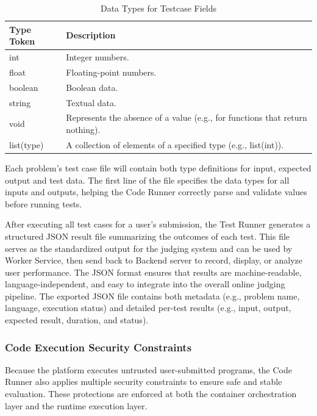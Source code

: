 \begin{table}[h!]
\centering
\renewcommand{\arraystretch}{1.3}
\begin{tabular}{|p{4cm}|p{10cm}|}
\hline
\textbf{Type Token} & \textbf{Description} \\ \hline

int & Integer numbers. \\ \hline

float & Floating-point numbers. \\ \hline

boolean & Boolean data. \\ \hline

string & Textual data. \\ \hline

void & Represents the absence of a value (e.g., for functions that return nothing). \\ \hline

list(type) & A collection of elements of a specified type (e.g., list(int)). \\ \hline

\end{tabular}
\caption{Data Types for Testcase Fields}
\end{table}
Each problem’s test case file will contain both type definitions for input, expected output and test data. The first line of the file specifies the data types for all inputs and outputs, helping the Code Runner correctly parse and validate values before running tests.

After executing all test cases for a user’s submission, the Test Runner generates a structured JSON result file summarizing the outcomes of each test. This file serves as the standardized output for the judging system and can be used by Worker Service, then send back to Backend server to record, display, or analyze user performance. The JSON format ensures that results are machine-readable, language-independent, and easy to integrate into the overall online judging pipeline. The exported JSON file contains both metadata (e.g., problem name, language, execution status) and detailed per-test results (e.g., input, output, expected result, duration, and status).

\subsubsection{Code Execution Security Constraints}

Because the platform executes untrusted user-submitted programs, the Code Runner also applies multiple security constraints to ensure safe and stable evaluation. These protections are enforced at both the container orchestration layer and the runtime execution layer.

